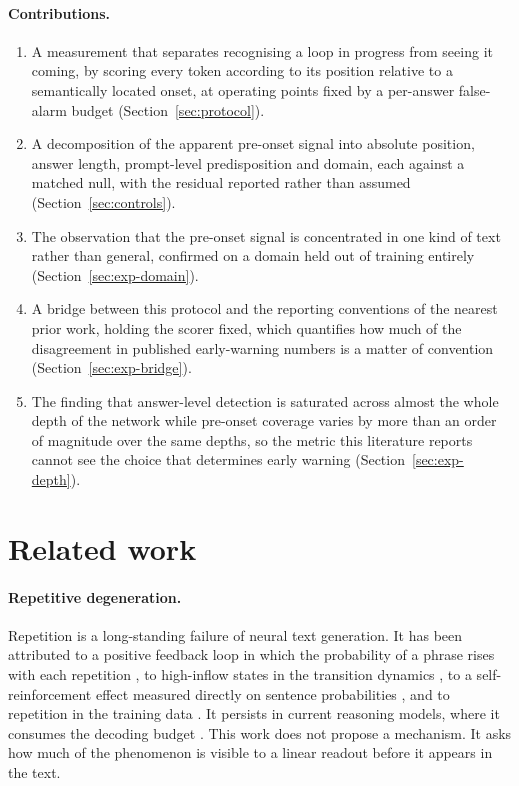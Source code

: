 \documentclass{article}
\begin{document}
\paragraph{Contributions.}
\begin{enumerate}
  \item A measurement that separates recognising a loop in progress from seeing
  it coming, by scoring every token according to its position relative to a
  semantically located onset, at operating points fixed by a per-answer
  false-alarm budget (Section~\ref{sec:protocol}).
  \item A decomposition of the apparent pre-onset signal into absolute position,
  answer length, prompt-level predisposition and domain, each against a matched
  null, with the residual reported rather than assumed (Section~\ref{sec:controls}).
  \item The observation that the pre-onset signal is concentrated in one kind of
  text rather than general, confirmed on a domain held out of training entirely
  (Section~\ref{sec:exp-domain}).
  \item A bridge between this protocol and the reporting conventions of the
  nearest prior work, holding the scorer fixed, which quantifies how much of the
  disagreement in published early-warning numbers is a matter of convention
  (Section~\ref{sec:exp-bridge}).
  \item The finding that answer-level detection is saturated across almost the
  whole depth of the network while pre-onset coverage varies by more than an
  order of magnitude over the same depths, so the metric this literature reports
  cannot see the choice that determines early warning (Section~\ref{sec:exp-depth}).
\end{enumerate}

\section{Related work}
\label{sec:related}

\paragraph{Repetitive degeneration.}
Repetition is a long-standing failure of neural text generation. It has been
attributed to a positive feedback loop in which the probability of a phrase
rises with each repetition \citep{holtzman2020curious}, to high-inflow states in
the transition dynamics \citep{fu2021theoretical}, to a self-reinforcement effect
measured directly on sentence probabilities \citep{xu2022learning}, and to
repetition in the training data \citep{li2023repetition}. It persists in current
reasoning models, where it consumes the decoding budget
\citep{xie2025wordsalad,dong2025rethinking}. This work does not propose a
mechanism. It asks how much of the phenomenon is visible to a linear readout
before it appears in the text.
\end{document}
